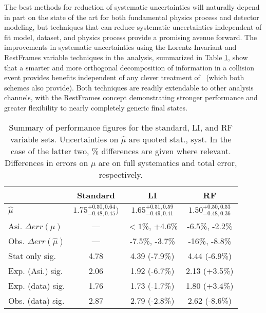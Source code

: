 The best methods for reduction of systematic uncertainties will naturally depend in part on the state of the art for both fundamental physics process and detector modeling, but techniques that can reduce systematic uncertainties independent of fit model, dataset, and physics process provide a promising avenue forward.  The improvements in systematic uncertainties using the Lorentz Invariant and RestFrames variable techniques in the \ZH\,analysis, summarized in Table \ref{tab:kahuna2}, show that a smarter and more orthogonal decomposition of information in a collision event provides benefits independent of any clever treatment of \met\, (which both schemes also provide).  Both techniques are readily extendable to other analysis channels, with the RestFrames concept demonstrating stronger performance and greater flexibility to nearly completely generic final states.

\begin{table}[!htbp]\captionsetup{justification=centering}
\caption{Summary of performance figures for the standard, LI, and RF variable sets.  Uncertainties on $\hat{\mu}$ are quoted stat., syst.  In the case of the latter two, \% differences are given where relevant.  Differences in errors on $\mu$ are on full systematics and total error, respectively.}
\begin{center}
\begin{tabular}{lccc}
\hline\hline
 & Standard &LI &RF\\
\hline
$\hat{\mu}$ & $1.75^{+0.50,0.64}_{-0.48,0.45})$ & $1.65^{+0.51,0.59}_{-0.49,0.41}$ & $1.50^{+0.50,0.53}_{-0.48,0.36}$\\
Asi. $\Delta err\left(\mu\right)$ &  --- & $<1$\%, +4.6\% & -6.5\%, -2.2\%\\
Obs. $\Delta err\left(\hat{\mu}\right)$ &  --- & -7.5\%, -3.7\% & -16\%, -8.8\%\\
\hline
Stat only sig. & 4.78 & 4.39 (-7.9\%) & 4.44 (-6.9\%)\\
Exp. (Asi.) sig. & 2.06 & 1.92 (-6.7\%) & 2.13 (+3.5\%)\\
Exp. (data) sig. & 1.76 & 1.73 (-1.7\%) & 1.80 (+3.4\%)\\
Obs. (data) sig. & 2.87 & 2.79 (-2.8\%) & 2.62 (-8.6\%)\\
\hline\hline
\end{tabular}
\end{center}
\label{tab:kahuna2}
\end{table}

